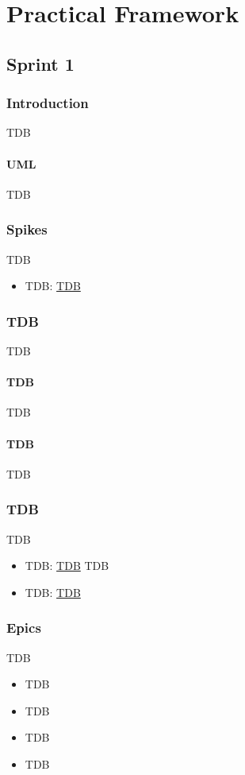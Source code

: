 \section{Practical Framework}


\subsection{Sprint 1}
\subsubsection{Introduction}
TDB
\paragraph{UML}
TDB
\subsubsection{Spikes}
TDB
\begin{itemize}    
    \item TDB: \href{}{TDB}
\end{itemize}


\subsubsection{TDB}
TDB

\paragraph{TDB}
TDB

\paragraph{TDB}
TDB

\subsubsection{TDB}
TDB
\begin{itemize}
\item TDB: \href{}{TDB}
TDB
\item TDB: \href{}{TDB}
\end{itemize}
\newpage

\subsubsection{Epics}
TDB
\begin{itemize}
    \item TDB
    \item TDB
    \item TDB
    \item TDB
\end{itemize}

